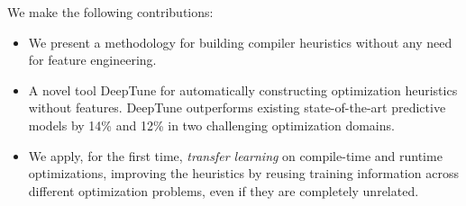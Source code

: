 We make the following contributions:
%
\begin{itemize}
  \item We present a methodology for building compiler heuristics without any
  need for feature engineering.
  \item A novel tool DeepTune for automatically constructing optimization
  heuristics without features. DeepTune outperforms existing state-of-the-art
  predictive models by 14\% and 12\% in two challenging optimization domains.
  \item We apply, for the first time, \emph{transfer learning} on compile-time
  and runtime optimizations, improving the heuristics by reusing training
  information across different optimization problems, even if they are
  completely unrelated.
\end{itemize}
